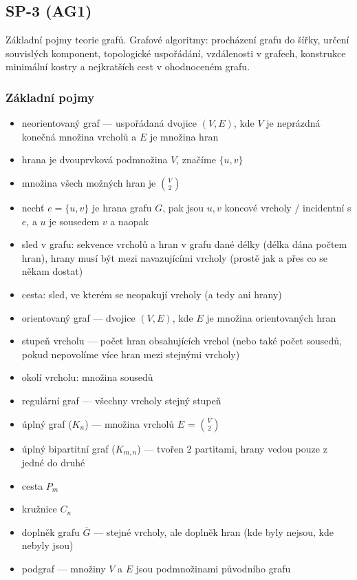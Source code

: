 \subsection{SP-3 (AG1)}
Základní pojmy teorie grafů. Grafové algoritmy: procházení grafu do šířky, určení souvislých komponent, topologické uspořádání, vzdálenosti v grafech, konstrukce minimální kostry a nejkratších cest v ohodnoceném grafu.

\subsubsection*{Základní pojmy}
\begin{itemize}
	\item neorientovaný graf --- uspořádaná dvojice $(V, E)$, kde $V$ je neprázdná konečná množina vrcholů a $E$ je množina hran
	\item hrana je dvouprvková podmnožina $V$, značíme $\{u,v\}$
	\item množina všech možných hran je $\binom{V}{2}$
	\item nechť $e = \{u, v\}$ je hrana grafu $G$, pak jsou $u,v$ koncové vrcholy / incidentní s $e$, a $u$ je sousedem $v$ a naopak 
	\item sled v grafu: sekvence vrcholů a hran v grafu dané délky (délka dána počtem hran), hrany musí být mezi navazujícími vrcholy (prostě jak a přes co se někam dostat) 
	\item cesta: sled, ve kterém se neopakují vrcholy (a tedy ani hrany)
	\item orientovaný graf --- dvojice $(V, E)$, kde $E$ je množina orientovaných hran
	\item stupeň vrcholu --- počet hran obsahujících vrchol (nebo také počet sousedů, pokud nepovolíme více hran mezi stejnými vrcholy)
	\item okolí vrcholu: množina sousedů
	\item regulární graf --- všechny vrcholy stejný stupeň
	\item úplný graf ($K_n$) --- množina vrcholů $E$ = $\binom{V}{2}$
	\item úplný bipartitní graf ($K_{m,n}$) --- tvořen 2 partitami, hrany vedou pouze z jedné do druhé
	\item cesta $P_m$
	\item kružnice $C_n$
	\item doplněk grafu $\overline{G}$ --- stejné vrcholy, ale doplněk hran (kde byly nejsou, kde nebyly jsou)
	\item podgraf --- množiny $V$ a $E$ jsou podmnožinami původního grafu

\end{itemize}
